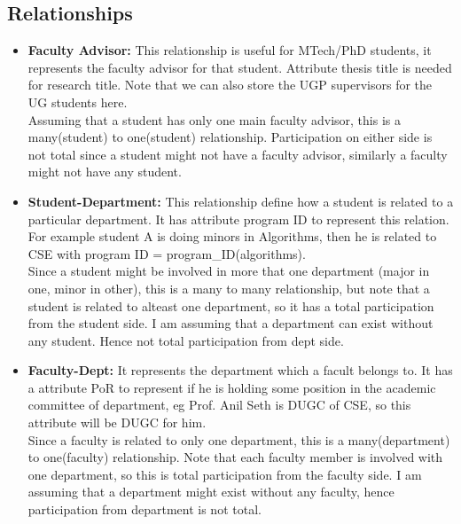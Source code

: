 \documentclass[a4paper]{article}
\begin{document}
\subsection*{Relationships}
\begin{itemize}
	\item{\textbf{Faculty Advisor:}} This relationship is useful for MTech/PhD students, it represents
	the faculty advisor for that student. Attribute thesis title is needed for research title.
	Note that we can also store the UGP supervisors for the UG students here. \\
	Assuming that a student has only one main faculty advisor, this is a many(student) to one(student) relationship.
	Participation on either side is not total since a student might not have a faculty advisor,
	similarly a faculty might not have any student.

	\item{\textbf{Student-Department:}} This relationship define how a student is related to a particular department.
	It has attribute program ID to represent this relation. For example student A is doing minors in
	Algorithms, then he is related to CSE with program ID = program\_ID(algorithms). \\
	Since a student might be involved in more that one department (major in one, minor in other),
	this is a many to many relationship, but note that a student is related to alteast one department,
	so it has a total participation from the student side. I am assuming that a department can exist without any student.
	Hence not total participation from dept side.

	\item{\textbf{Faculty-Dept:}} It represents the department which a facult belongs to. 
	It has a attribute PoR to represent if he is holding some position in the academic committee of department,
	eg Prof. Anil Seth is DUGC of CSE, so this attribute will be DUGC for him. \\
	Since a faculty is related to only one department, this is a many(department) to one(faculty) relationship.
	Note that each faculty member is involved with one department, so this is total participation from the faculty side.
	I am assuming that a department might exist without any faculty, hence participation from department is not total.


\end{itemize}
\end{document}

